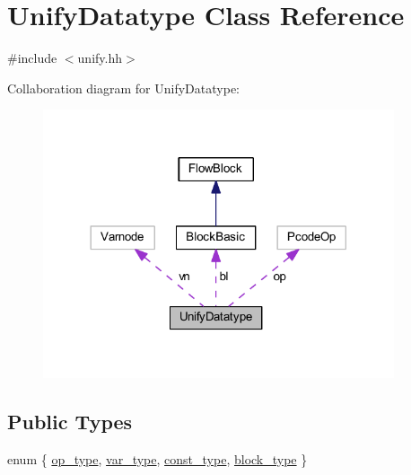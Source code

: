 \hypertarget{class_unify_datatype}{}\section{Unify\+Datatype Class Reference}
\label{class_unify_datatype}


{\ttfamily \#include $<$unify.\+hh$>$}



Collaboration diagram for Unify\+Datatype\+:
\nopagebreak
\begin{figure}[H]
\begin{center}
\leavevmode
\includegraphics[width=293pt]{class_unify_datatype__coll__graph}
\end{center}
\end{figure}
\subsection*{Public Types}
\begin{DoxyCompactItemize}
\item 
enum \{ \mbox{\hyperlink{class_unify_datatype_afa325e5ad483cbc4dd821b426d197d87a69b798b908a39a761c271cf4c271f67f}{op\+\_\+type}}, 
\mbox{\hyperlink{class_unify_datatype_afa325e5ad483cbc4dd821b426d197d87a6681e429d344f056e5cce3fe7be773ca}{var\+\_\+type}}, 
\mbox{\hyperlink{class_unify_datatype_afa325e5ad483cbc4dd821b426d197d87a26e68a49d2479b8b77630aaa525a79d4}{const\+\_\+type}}, 
\mbox{\hyperlink{class_unify_datatype_afa325e5ad483cbc4dd821b426d197d87aec7e207a26629c3e1b81883863911c05}{block\+\_\+type}}
 \}
\end{DoxyCompactItemize}
